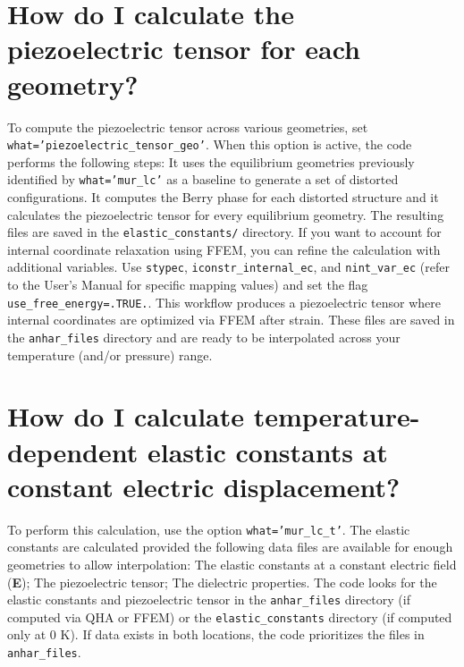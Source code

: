\documentclass[12pt,a4paper,twoside]{report}
\begin{document}
\newpage

{\color{coral}\section{How do I calculate the piezoelectric tensor 
for each geometry?}}
\color{black}
To compute the piezoelectric tensor across various geometries, set 
\texttt{what='piezoelectric\_tensor\_geo'}.
When this option is active, the code performs the following steps:
It uses the equilibrium geometries previously identified by 
\texttt{what='mur\_lc'} as a baseline to generate a set of 
distorted configurations. It computes the Berry phase for each 
distorted structure and it calculates the piezoelectric tensor for 
every equilibrium geometry.
The resulting files are saved in the \texttt{elastic\_constants/} directory.
If you want to account for internal coordinate relaxation using FFEM, 
you can refine the calculation with additional variables.
Use \texttt{stypec}, \texttt{iconstr\_internal\_ec}, and 
\texttt{nint\_var\_ec} (refer to the User’s Manual for specific 
mapping values) and set the flag \texttt{use\_free\_energy=.TRUE.}.
This workflow produces a piezoelectric tensor where internal coordinates 
are optimized via FFEM after strain. These files are saved in the 
\texttt{anhar\_files} directory and are ready to be interpolated 
across your temperature (and/or pressure) range.

\newpage
{\color{coral}\section{How do I calculate temperature-dependent 
elastic constants at constant electric displacement?}}
\color{black}

To perform this calculation, use the option \texttt{what='mur\_lc\_t'}. 
The elastic constants are calculated provided the following 
data files are available for enough geometries to allow interpolation:
The elastic constants at a constant electric field ({\bf E});
The piezoelectric tensor; The dielectric properties.
The code looks for the elastic constants and piezoelectric tensor 
in the \texttt{anhar\_files} directory (if computed via QHA or FFEM) 
or the \texttt{elastic\_constants} directory (if computed only at $0$ K). 
If data exists in both locations, the code prioritizes the files 
in \texttt{anhar\_files}.

\newpage
\end{document}
